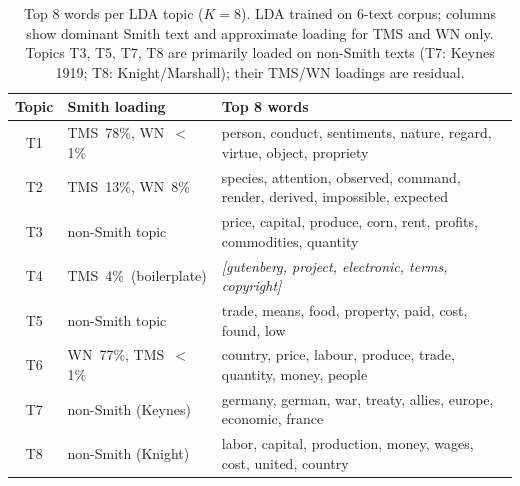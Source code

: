 \documentclass[12pt,a4paper]{article}
\begin{document}
\begin{table}[H]
\centering
\caption{Top 8 words per LDA topic ($K = 8$). LDA trained on 6-text corpus;
         columns show dominant Smith text and approximate loading for TMS and WN
         only. Topics T3, T5, T7, T8 are primarily loaded on non-Smith texts
         (T7: Keynes 1919; T8: Knight/Marshall); their TMS/WN loadings are
         residual.}
\small
\begin{tabular}{clp{8.5cm}}
\toprule
Topic & Smith loading & Top 8 words \\
\midrule
T1 & TMS~78\%, WN~$<$1\% & person, conduct, sentiments, nature, regard, virtue, object, propriety \\
T2 & TMS~13\%, WN~8\%    & species, attention, observed, command, render, derived, impossible, expected \\
T3 & non-Smith topic     & price, capital, produce, corn, rent, profits, commodities, quantity \\
T4 & TMS~4\%~(boilerplate) & \textit{[gutenberg, project, electronic, terms, copyright]} \\
T5 & non-Smith topic     & trade, means, food, property, paid, cost, found, low \\
T6 & WN~77\%, TMS~$<$1\% & country, price, labour, produce, trade, quantity, money, people \\
T7 & non-Smith (Keynes)  & germany, german, war, treaty, allies, europe, economic, france \\
T8 & non-Smith (Knight)  & labor, capital, production, money, wages, cost, united, country \\
\bottomrule
\end{tabular}
\end{table}
\end{document}
